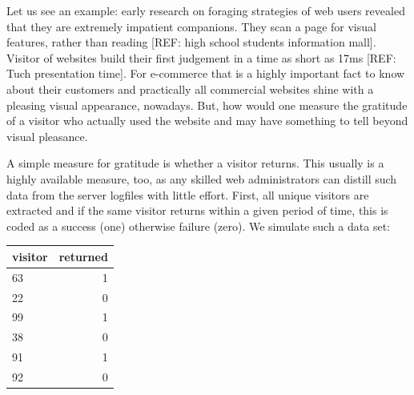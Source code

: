 \documentclass[]{svmono}
\newenvironment{Shaded}{\begin{snugshade}}{\end{snugshade}}
\newcommand{\KeywordTok}[1]{\textcolor[rgb]{0.13,0.29,0.53}{\textbf{#1}}}
\newcommand{\DataTypeTok}[1]{\textcolor[rgb]{0.13,0.29,0.53}{#1}}
\newcommand{\DecValTok}[1]{\textcolor[rgb]{0.00,0.00,0.81}{#1}}
\newcommand{\StringTok}[1]{\textcolor[rgb]{0.31,0.60,0.02}{#1}}
\newcommand{\OperatorTok}[1]{\textcolor[rgb]{0.81,0.36,0.00}{\textbf{#1}}}
\newcommand{\NormalTok}[1]{#1}
\theoremstyle{definition}
\theoremstyle{definition}
\theoremstyle{definition}
\theoremstyle{remark}
\begin{document}
Let us see an example: early research on foraging strategies of web
users revealed that they are extremely impatient companions. They scan a
page for visual features, rather than reading {[}REF: high school
students information mall{]}. Visitor of websites build their first
judgement in a time as short as 17ms {[}REF: Tuch presentation time{]}.
For e-commerce that is a highly important fact to know about their
customers and practically all commercial websites shine with a pleasing
visual appearance, nowadays. But, how would one measure the gratitude of
a visitor who actually used the website and may have something to tell
beyond visual pleasance.

A simple measure for gratitude is whether a visitor returns. This
usually is a highly available measure, too, as any skilled web
administrators can distill such data from the server logfiles with
little effort. First, all unique visitors are extracted and if the same
visitor returns within a given period of time, this is coded as a
success (one) otherwise failure (zero). We simulate such a data set:

\begin{Shaded}
\end{Shaded}

\begin{tabular}{l|r}
\hline
visitor & returned\\
\hline
63 & 1\\
\hline
22 & 0\\
\hline
99 & 1\\
\hline
38 & 0\\
\hline
91 & 1\\
\hline
92 & 0\\
\hline
\end{tabular}

\begin{Shaded}
\end{Shaded}
\end{document}
